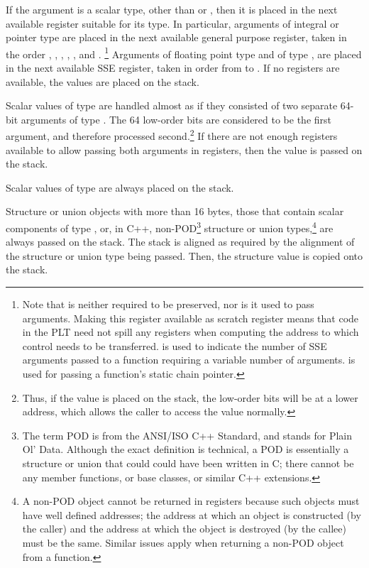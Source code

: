 If the argument is a scalar type, other than  or
, then it is placed in the next available register
suitable for its type.  In particular, arguments of integral or
pointer type are placed in the next available general purpose
register, taken in the order \RDI, \RSI, \RDX, \RCX, , and
.  \footnote{Note that  is neither required to
  be preserved, nor is it used to pass arguments.  Making this
  register available as scratch register means that code in the PLT
  need not spill any registers when computing the address to which
  control needs to be transferred.  \RAX is used to indicate the
  number of SSE arguments passed to a function requiring a variable
  number of arguments.  is used for passing a function's
  static chain pointer.}  Arguments of floating point type and of type
, are placed in the next available SSE register, taken in
order from  to .  If no registers are available,
the values are placed on the stack.

Scalar values of type  are handled almost as if they
consisted of two separate 64-bit arguments of type .  The
64 low-order bits are considered to be the first argument, and
therefore processed second.\footnote{Thus, if the value is placed on
  the stack, the low-order bits will be at a lower address, which
  allows the caller to access the value normally.}  If there are not
enough registers available to allow passing both arguments in
registers, then the value is passed on the stack.

Scalar values of type  are always placed on the stack.

Structure or union objects with more than 16 bytes, those that contain
scalar components of type , or, in C++,
non-POD\footnote{The term POD is from the ANSI/ISO C++ Standard, and
  stands for Plain Ol' Data.  Although the exact definition is
  technical, a POD is essentially a structure or union that could
  could have been written in C; there cannot be any member functions,
  or base classes, or similar C++ extensions.}  structure or union
types,\footnote{A non-POD object cannot be returned in registers
  because such objects must have well defined addresses; the address
  at which an object is constructed (by the caller) and the address at
  which the object is destroyed (by the callee) must be the same.
  Similar issues apply when returning a non-POD object from a
  function.} are always passed on the stack.  The stack is aligned as
required by the alignment of the structure or union type being passed.
Then, the structure value is copied onto the stack.

